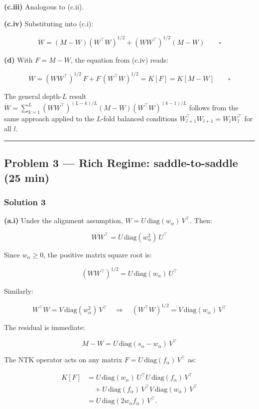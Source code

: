 \documentclass[
]{article}
\begin{document}
\textbf{(c.iii)} Analogous to (c.ii).

\textbf{(c.iv)} Substituting into (c.i):

\[\dot{W} = (M - W)(W^\top W)^{1/2} + (WW^\top)^{1/2}(M - W) \qquad \square\]

\textbf{(d)} With \(F = M - W\), the equation from (c.iv) reads:

\[\dot{W} = (WW^\top)^{1/2}\,F + F\,(W^\top W)^{1/2} = K[F] = K[M - W] \qquad \square\]

The general depth-\(L\) result
\(\dot{W} = \sum_{k=1}^{L}(WW^\top)^{(L-k)/L}(M-W)(W^\top W)^{(k-1)/L}\)
follows from the same approach applied to the \(L\)-fold balanced
conditions \(W_{l+1}^\top W_{l+1} = W_l W_l^\top\) for all \(l\).

\begin{center}\rule{0.5\linewidth}{0.5pt}\end{center}

\subsection{Problem 3 --- Rich Regime: saddle-to-saddle (25
min)}\label{problem-3-rich-regime-incremental-learning-25-min}

\subsubsection{Solution 3}\label{solution-3}

\textbf{(a.i)} Under the alignment assumption,
\(W = U\,\text{diag}(w_\alpha)\,V^\top\). Then:

\[WW^\top = U\,\text{diag}(w_\alpha^2)\,U^\top\]

Since \(w_\alpha \geq 0\), the positive matrix square root is:

\[(WW^\top)^{1/2} = U\,\text{diag}(w_\alpha)\,U^\top\]

Similarly:

\[W^\top W = V\,\text{diag}(w_\alpha^2)\,V^\top \quad \Longrightarrow \quad (W^\top W)^{1/2} = V\,\text{diag}(w_\alpha)\,V^\top\]

The residual is immediate:

\[M - W = U\,\text{diag}(s_\alpha - w_\alpha)\,V^\top\]

The NTK operator acts on any matrix
\(F = U\,\text{diag}(f_\alpha)\,V^\top\) as:

\[
\begin{aligned}
K[F]
&=
U\,\text{diag}(w_\alpha)\,U^\top
U\,\text{diag}(f_\alpha)\,V^\top \\
&\quad
+ U\,\text{diag}(f_\alpha)\,V^\top
V\,\text{diag}(w_\alpha)\,V^\top \\
&=
U\,\text{diag}(2w_\alpha f_\alpha)\,V^\top.
\end{aligned}
\]
\end{document}
